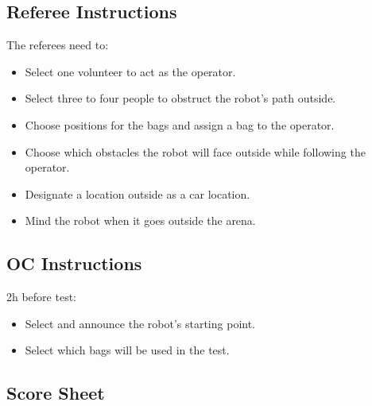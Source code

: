 \subsection*{Referee Instructions}

The referees need to:
\begin{itemize}[nosep]
	\item Select one volunteer to act as the operator.
	\item Select three to four people to obstruct the robot's path outside.
	\item Choose positions for the bags and assign a bag to the operator.
	\item Choose which obstacles the robot will face outside while following the operator.
	\item Designate a location outside as a car location.
	\item Mind the robot when it goes outside the arena.
\end{itemize}

\subsection*{OC Instructions}

2h before test:
\begin{itemize}[nosep]
	\item Select and announce the robot's starting point.
	\item Select which bags will be used in the test.
\end{itemize}

\subsection*{Score Sheet}

